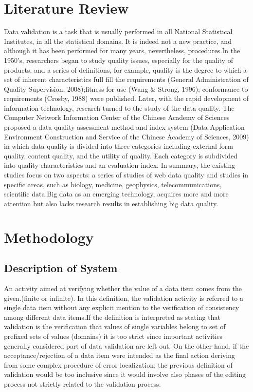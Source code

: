\documentclass[12pt,]{article}
\begin{document}
\section{Literature Review}
Data validation is a task that is usually performed in all National Statistical Institutes, in all the statistical domains. It is indeed not a new practice, and although it has been performed for many years, nevertheless, procedures.In the 1950's, researchers began to study quality issues, especially for the quality of products, and a series of definitions, for example, quality is the degree to which a set of inherent characteristics full fill the requirements (General Administration of Quality Supervision, 2008);fitness for use (Wang & Strong, 1996); conformance to requirements (Crosby, 1988) were published. Later, with the rapid development of information technology, research turned to the study of the data quality. 
The Computer Network Information Center of the Chinese Academy of Sciences proposed a data quality assessment method and index system (Data Application Environment Construction and Service of the Chinese Academy of Sciences, 2009) in which data quality is divided into three categories including external form quality, content quality, and the utility of quality. Each category is subdivided into quality characteristics and an evaluation index. 
In summary, the existing studies focus on two aspects: a series of studies of web data quality and studies in specific areas, such as biology, medicine, geophysics, telecommunications, scientific data.Big data as an emerging technology, acquires more and more attention but also lacks research results in establishing big data quality.

\section{Methodology}
\subsection{Description of System}
An activity aimed at verifying whether the value of a data item comes from the given.(finite or infinite).
In this definition, the validation activity is referred to a single data item without any explicit mention to the verification of consistency among different data items.If the definition is interpreted as stating that validation is the verification that values of single variables belong to set of prefixed sets of values (domains) it is too strict since important activities generally considered part of data validation are left out. On the other hand, if the acceptance/rejection of a data item were intended as the final action deriving from some complex procedure of error localization, the previous definition of validation would be too inclusive since it would involve also phases of the editing process not strictly related to the validation process.
\end{document}
